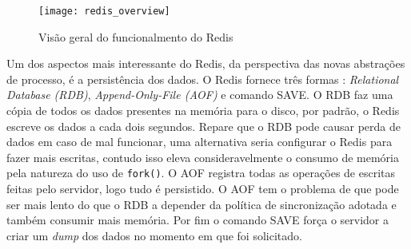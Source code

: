 \begin{figure}[!h]
  \centering
  \texttt{[image: redis\_overview]}
  \caption{Visão geral do funcionalmento do Redis}
  \label{fig:redis}
\end{figure}

Um dos aspectos mais interessante do Redis, da perspectiva das novas abstrações
de processo, é a persistência dos dados. O Redis fornece três formas
\citep{redisio}: \textit{Relational Database (RDB)}, \textit{Append-Only-File
(AOF)} e comando SAVE. O RDB faz uma cópia de todos os dados presentes na
memória para o disco, por padrão, o Redis escreve os dados a cada dois
segundos. Repare que o RDB pode causar perda de dados em caso de mal funcionar,
uma alternativa seria configurar o Redis para fazer mais escritas, contudo isso
eleva consideravelmente o consumo de memória pela natureza do uso de
\texttt{fork()}. O AOF registra todas as operações de escritas feitas pelo
servidor, logo tudo é persistido. O AOF tem o problema de que pode ser mais
lento do que o RDB a depender da política de sincronização adotada e também
consumir mais memória.  Por fim o comando SAVE força o servidor a criar um
\textit{dump} dos dados no momento em que foi solicitado.

